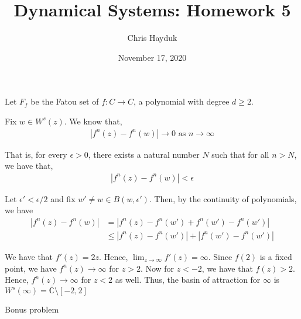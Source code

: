 \documentclass[12pt]{article}
\newenvironment{problem}[2][Problem]{\begin{trivlist}
\item[\hskip \labelsep {\bfseries #1}\hskip \labelsep {\bfseries #2.}]}{\end{trivlist}}
\begin{document}
\title{Dynamical Systems: Homework 5}

\author{Chris Hayduk}
\date{November 17, 2020}

\maketitle

\begin{problem}{1}
\end{problem}

Let $F_f$ be the Fatou set of $f: C \to C$, a polynomial with degree $d \geq 2$.

\begin{problem}{2}
\end{problem}

Fix $w \in W^s(z)$. We know that,
\begin{align*}
| f^n(z) - f^n(w) | \to 0 \text{ as } n \to \infty
\end{align*}

That is, for every $\epsilon > 0$, there exists a natural number $N$ such that for all $n > N$, we have that,
\begin{align*}
| f^n(z) - f^n(w) | < \epsilon
\end{align*}

Let $\epsilon' < \epsilon/2$ and fix $w' \neq w \in B(w, \epsilon')$. Then, by the continuity of polynomials, we have
\begin{align*}
|f^n(z) - f^n(w)| &= |f^n(z) - f^n(w') + f^n(w') - f^n(w')|\\
&\leq |f^n(z) - f^n(w')| + |f^n(w') - f^n(w')|
\end{align*}

\begin{problem}{3}
\end{problem}

We have that $f'(z) = 2z$. Hence, $\lim_{z \to \infty} f'(z) = \infty$. Since $f(2)$ is a fixed point, we have $f^n(z) \to \infty$ for $z > 2$. Now for $z < -2$, we have that $f(z) > 2$. Hence, $f^n(z) \to \infty$ for $z < 2$ as well. Thus, the basin of attraction for $\infty$ is $W^s(\infty) = \overline{\mathbb{C}} \setminus [-2, 2]$

\begin{problem}{4}
\end{problem}

\begin{problem}{5}
Bonus problem
\end{problem}
\end{document}
